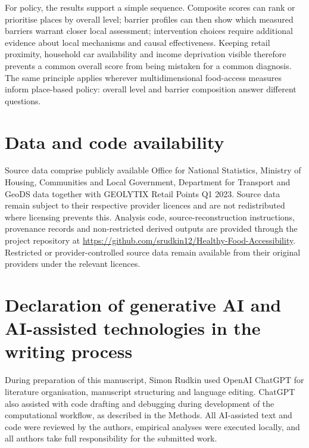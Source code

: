 \documentclass[11pt,a4paper]{article}
\begin{document}
For policy, the results support a simple sequence. Composite scores can rank or prioritise places by overall level; barrier profiles can then show which measured barriers warrant closer local assessment; intervention choices require additional evidence about local mechanisms and causal effectiveness. Keeping retail proximity, household car availability and income deprivation visible therefore prevents a common overall score from being mistaken for a common diagnosis. The same principle applies wherever multidimensional food-access measures inform place-based policy: overall level and barrier composition answer different questions.

\section*{Data and code availability}
Source data comprise publicly available Office for National Statistics, Ministry of Housing, Communities and Local Government, Department for Transport and GeoDS data together with GEOLYTIX Retail Points Q1 2023. Source data remain subject to their respective provider licences and are not redistributed where licensing prevents this. Analysis code, source-reconstruction instructions, provenance records and non-restricted derived outputs are provided through the project repository at \url{https://github.com/srudkin12/Healthy-Food-Accessibility}. Restricted or provider-controlled source data remain available from their original providers under the relevant licences.

\section*{Declaration of generative AI and AI-assisted technologies in the writing process}
During preparation of this manuscript, Simon Rudkin used OpenAI ChatGPT for literature organisation, manuscript structuring and language editing. ChatGPT also assisted with code drafting and debugging during development of the computational workflow, as described in the Methods. All AI-assisted text and code were reviewed by the authors, empirical analyses were executed locally, and all authors take full responsibility for the submitted work.
\end{document}
